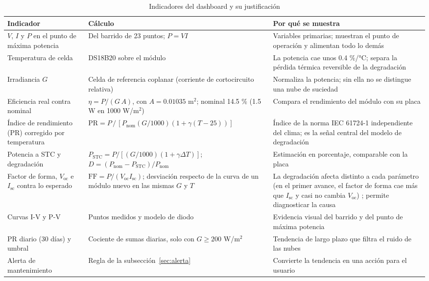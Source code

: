 \documentclass[10pt,letterpaper,twocolumn]{article}
\begin{document}
\begin{table}[!t]
\centering
\caption{Indicadores del dashboard y su justificación}
\label{tab:ind}
\footnotesize
\begin{tabularx}{\textwidth}{@{}p{3.2cm}p{5.4cm}X@{}}
\toprule
Indicador & Cálculo & Por qué se muestra\\
\midrule
$V$, $I$ y $P$ en el punto de máxima potencia & Del barrido de 23 puntos; $P=VI$ & Variables primarias; muestran el punto de operación y alimentan todo lo demás\\
Temperatura de celda & DS18B20 sobre el módulo & La potencia cae unos 0.4 \%/°C; separa la pérdida térmica reversible de la degradación\\
Irradiancia $G$ & Celda de referencia coplanar (corriente de cortocircuito relativa) & Normaliza la potencia; sin ella no se distingue una nube de suciedad\\
Eficiencia real contra nominal & $\eta=P/(G\,A)$, con $A=0.01035$ m$^2$; nominal 14.5 \% (1.5 W en 1000 W/m$^2$) & Compara el rendimiento del módulo con su placa\\
Índice de rendimiento (PR) corregido por temperatura & $\mathrm{PR}=P\,/\,[P_\mathrm{nom}(G/1000)(1+\gamma(T-25))]$ & Índice de la norma IEC 61724-1 independiente del clima; es la señal central del modelo de degradación\\
Potencia a STC y degradación & $P_\mathrm{STC}=P/[(G/1000)(1+\gamma\Delta T)]$; $D=(P_\mathrm{nom}-P_\mathrm{STC})/P_\mathrm{nom}$ & Estimación en porcentaje, comparable con la placa\\
Factor de forma, $V_\mathrm{oc}$ e $I_\mathrm{sc}$ contra lo esperado & $\mathrm{FF}=P/(V_\mathrm{oc}I_\mathrm{sc})$; desviación respecto de la curva de un módulo nuevo en las mismas $G$ y $T$ & La degradación afecta distinto a cada parámetro (en el primer avance, el factor de forma cae más que $I_\mathrm{sc}$ y casi no cambia $V_\mathrm{oc}$) \cite{avance1}; permite diagnosticar la causa\\
Curvas I-V y P-V & Puntos medidos y modelo de diodo & Evidencia visual del barrido y del punto de máxima potencia\\
PR diario (30 días) y umbral & Cociente de sumas diarias, solo con $G\ge 200$ W/m$^2$ & Tendencia de largo plazo que filtra el ruido de las nubes\\
Alerta de mantenimiento & Regla de la subsección~\ref{sec:alerta} & Convierte la tendencia en una acción para el usuario\\
\bottomrule
\end{tabularx}
\end{table}
\end{document}
